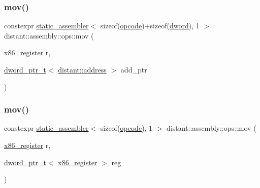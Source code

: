 \mbox{\label{namespacedistant_1_1assembly_1_1ops_a4d102637b6bc49f0d3064093b96936ba}} 
\subsubsection{\texorpdfstring{mov()}{mov()}\hspace{0.1cm}{\footnotesize\ttfamily [3/4]}}
{\footnotesize\ttfamily constexpr \mbox{\hyperlink{classdistant_1_1assembly_1_1static__assembler}{static\+\_\+assembler}}$<$ sizeof(\mbox{\hyperlink{namespacedistant_1_1assembly_a64d7b047d9e3df1ac04919f7c4f8f6fa}{opcode}})+sizeof(\mbox{\hyperlink{namespacedistant_a9fa41a5a1a17dcbd24da1c1855c92489}{dword}}), 1 $>$ distant\+::assembly\+::ops\+::mov (\begin{DoxyParamCaption}\item[{\mbox{\hyperlink{namespacedistant_1_1assembly_a873d3faa0111fc5605de36beaaaafb3e}{x86\+\_\+register}}}]{r,  }\item[{\mbox{\hyperlink{structdistant_1_1assembly_1_1dword__ptr__t}{dword\+\_\+ptr\+\_\+t}}$<$ \mbox{\hyperlink{namespacedistant_a9d7aa6e07cb2f50321e29c209f9a7886}{distant\+::address}} $>$}]{add\+\_\+ptr }\end{DoxyParamCaption})}

\mbox{\label{namespacedistant_1_1assembly_1_1ops_a075958a6f9d92ca9510e670e267b49a1}} 
\subsubsection{\texorpdfstring{mov()}{mov()}\hspace{0.1cm}{\footnotesize\ttfamily [4/4]}}
{\footnotesize\ttfamily constexpr \mbox{\hyperlink{classdistant_1_1assembly_1_1static__assembler}{static\+\_\+assembler}}$<$ sizeof(\mbox{\hyperlink{namespacedistant_1_1assembly_a64d7b047d9e3df1ac04919f7c4f8f6fa}{opcode}}), 1 $>$ distant\+::assembly\+::ops\+::mov (\begin{DoxyParamCaption}\item[{\mbox{\hyperlink{namespacedistant_1_1assembly_a873d3faa0111fc5605de36beaaaafb3e}{x86\+\_\+register}}}]{r,  }\item[{\mbox{\hyperlink{structdistant_1_1assembly_1_1dword__ptr__t}{dword\+\_\+ptr\+\_\+t}}$<$ \mbox{\hyperlink{namespacedistant_1_1assembly_a873d3faa0111fc5605de36beaaaafb3e}{x86\+\_\+register}} $>$}]{reg }\end{DoxyParamCaption})}

